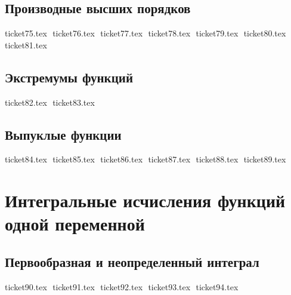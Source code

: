\section{Производные высших порядков}
{ticket75.tex}
$ $
{ticket76.tex}
$ $
{ticket77.tex}
$ $
{ticket78.tex}
$ $
{ticket79.tex}
$ $
{ticket80.tex}
$ $
{ticket81.tex}
$ $

\section{Экстремумы функций}
{ticket82.tex}
$ $
{ticket83.tex}
$ $

\section{Выпуклые функции}
{ticket84.tex}
$ $
{ticket85.tex}
$ $
{ticket86.tex}
$ $
{ticket87.tex}
$ $
{ticket88.tex}
$ $
{ticket89.tex}
$ $

\chapter{Интегральные исчисления функций одной переменной}
\section{Первообразная и неопределенный интеграл}
{ticket90.tex}
$ $
{ticket91.tex}
$ $
{ticket92.tex}
$ $
{ticket93.tex}
$ $
{ticket94.tex}
$ $